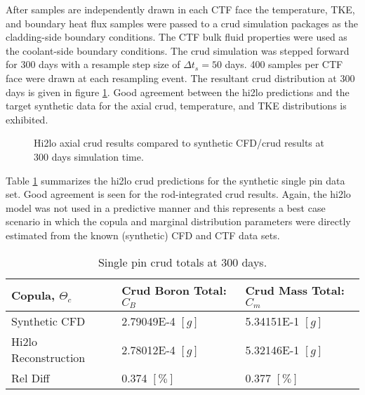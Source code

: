 After samples are independently drawn in each CTF face the temperature, TKE, and boundary heat flux samples were passed to a crud simulation packages as the cladding-side boundary conditions.  The CTF bulk fluid properties were used as the coolant-side boundary conditions.  The crud simulation was stepped forward for 300 days with a resample step size of $\Delta t_s =50$ days.  400 samples per CTF face were drawn at each resampling event. The resultant crud distribution at 300 days is given in figure \ref{fig:hi2lopincmass}.  Good agreement between the hi2lo predictions and the target synthetic data for the axial crud, temperature, and TKE distributions is exhibited.

\begin{figure}[H]%
    \captionsetup[subfigure]{justification=centering}
    \centering
    \hspace*{-1.0em}%
    \caption{Hi2lo axial crud results compared to synthetic CFD/crud results at 300 days simulation time. }%
    \label{fig:hi2lopincmass}%
\end{figure}


Table \ref{tab:crud_totals_2} summarizes the hi2lo crud predictions for the synthetic single pin data set.  Good agreement is seen for the rod-integrated crud results.  Again, the hi2lo model was not used in a predictive manner and this represents a best case scenario in which the copula and marginal distribution parameters were directly estimated from the known (synthetic) CFD and CTF data sets.

\begin{table}[h]
    \begin{center}
        \caption[Crud totals for synthetic and hi2lo models.]{Single pin crud totals at 300 days.}
        \begin{tabular}[h]{|l | l | l |}
            \hline
            Copula, $\Theta_c$ & Crud Boron Total: $C_B$ & Crud Mass Total: $C_m$ \\
            \hline  \hline
            Synthetic CFD &  2.79049E-4 $[g]$ & 5.34151E-1 $[g]$ \\
            Hi2lo Reconstruction &  2.78012E-4  $[g]$ & 5.32146E-1 $[g]$ \\
            \hline
            Rel Diff &  0.374 $[\%]$ & 0.377 $[\%]$ \\
            \hline
        \end{tabular}
        \label{tab:crud_totals_2}
    \end{center}
\end{table}



